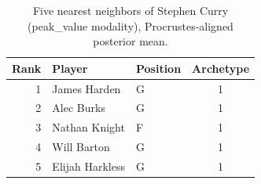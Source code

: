 \begin{table}[htbp]
  \centering\small
  \begin{tabular}{rllc}
    \toprule
    Rank & Player & Position & Archetype \\
    \midrule
    1 & James Harden & G & 1 \\
    2 & Alec Burks & G & 1 \\
    3 & Nathan Knight & F & 1 \\
    4 & Will Barton & G & 1 \\
    5 & Elijah Harkless & G & 1 \\
    \bottomrule
  \end{tabular}
  \caption{Five nearest neighbors of Stephen Curry (peak_value modality), Procrustes-aligned posterior mean.}
  \label{tab:Stephen_Curry_neighbors_peak_value}
\end{table}

